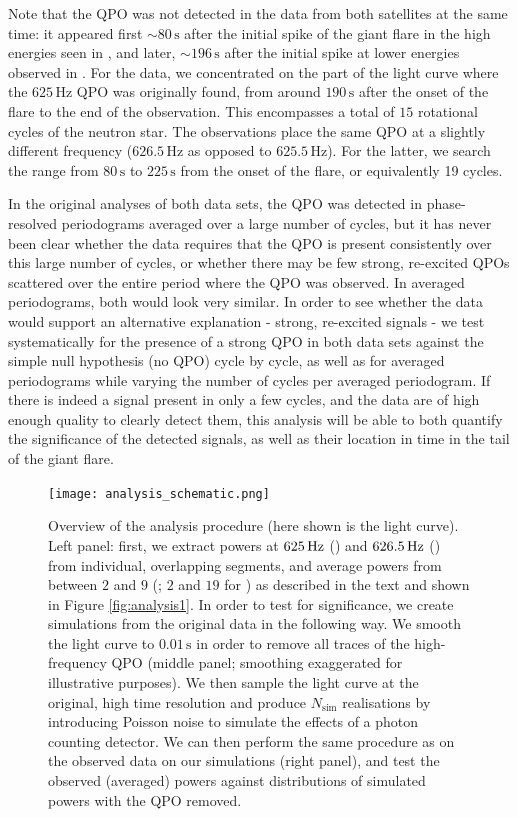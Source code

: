 \documentclass{emulateapj}
\begin{document}
Note that the QPO was not detected in the data from both satellites at the same time: it appeared first $\sim 80\,\mathrm{s}$ after the initial spike of the giant flare in the high energies seen in \rhessi, and later, $\sim 196 \,\mathrm{s}$ after the initial spike at lower energies observed in \rxte.
For the \rxte data, we concentrated on the part of the light curve where the $625 \, \mathrm{Hz}$ QPO was originally found, from around $190\, \mathrm{s}$ after the onset of the flare to the end of the observation. This encompasses a total of $15$ rotational cycles of the neutron star. The \rhessi observations place the same QPO at a slightly different frequency ($626.5 \, \mathrm{Hz}$ as opposed to $625.5 \, \mathrm{Hz}$). For the latter, we search the range from $80\, \mathrm{s}$ to $225 \, \mathrm{s}$ from the onset of the flare, or equivalently 19 cycles.

In the original analyses of both data sets, the QPO was detected in phase-resolved periodograms averaged over a large number of cycles, but it has never been clear whether the data requires that the QPO is present consistently over this large number of cycles, or whether there may be few strong, re-excited QPOs scattered over the entire period where the QPO was observed. In averaged periodograms, both would look very similar.
In order to see whether the data would support an alternative explanation - strong, re-excited signals - we test systematically for the presence of a strong QPO in both data sets against the simple null hypothesis (no QPO) cycle by cycle, as well as for averaged periodograms while varying the number of cycles per averaged periodogram. If there is indeed a signal present in only a few cycles, and the data are of high enough quality to clearly detect them, this analysis will be able to both quantify the significance of the detected signals, as well as their location in time in the tail of the giant flare.

\begin{figure}[htbp]
\begin{center}
\texttt{[image: analysis\_schematic.png]}
\caption{Overview of the analysis procedure (here shown is the \rxte light curve). Left panel: first, we extract powers at $625\,\mathrm{Hz}$ (\rxte) and $626.5\,\mathrm{Hz}$ (\rhessi) from individual, overlapping segments, and average powers from between $2$ and $9$ (\rxte; $2$ and $19$ for \rhessi) as described in the text and shown in Figure \ref{fig:analysis1}. In order to test for significance, we create simulations from the original data in the following way. We smooth the light curve to $0.01\,\mathrm{s}$ in order to remove all traces of the high-frequency QPO (middle panel; smoothing exaggerated for illustrative purposes). We then sample the light curve at the original, high time resolution and produce $N_\mathrm{sim}$ realisations by introducing Poisson noise to simulate the effects of a photon counting detector. We can then perform the same procedure as on the observed data on our simulations (right panel), and test the observed (averaged) powers against distributions of simulated powers with the QPO removed.}
\label{fig:analysis2}
\end{center}
\end{figure}
\end{document}
